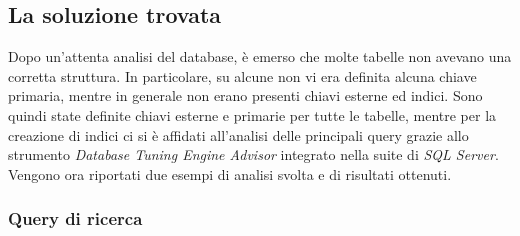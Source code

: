 \subsection{La soluzione trovata}
Dopo un'attenta analisi del database, è emerso che molte tabelle non avevano una corretta struttura. In particolare, su alcune non vi era definita alcuna chiave primaria, mentre in generale non erano presenti chiavi esterne ed indici. Sono quindi state definite chiavi esterne e primarie per tutte le tabelle, mentre per la creazione di indici ci si è affidati all'analisi delle principali query grazie allo strumento \textit{Database Tuning Engine Advisor} integrato nella suite di \textit{SQL Server}. Vengono ora riportati due esempi di analisi svolta e di risultati ottenuti.
\subsubsection{Query di ricerca}

